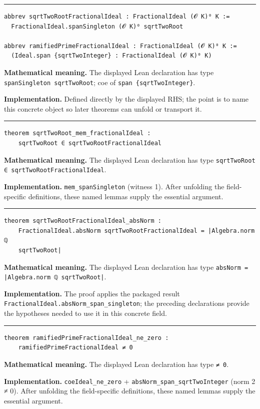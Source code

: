 \documentclass[UTF8,a4paper,11pt,fontset=fandol]{ctexart}
\theoremstyle{definition}
\newcommand{\statementsep}{\par\medskip\hrule\medskip}
\begin{document}
\statementsep
\begin{verbatim}
abbrev sqrtTwoRootFractionalIdeal : FractionalIdeal (𝓞 K)⁰ K :=
  FractionalIdeal.spanSingleton (𝓞 K)⁰ sqrtTwoRoot

abbrev ramifiedPrimeFractionalIdeal : FractionalIdeal (𝓞 K)⁰ K :=
  (Ideal.span {sqrtTwoInteger} : FractionalIdeal (𝓞 K)⁰ K)
\end{verbatim}
\noindent\textbf{Mathematical meaning.} The displayed Lean declaration has type \texttt{spanSingleton sqrtTwoRoot}; coe of \texttt{span \{sqrtTwoInteger\}}.\par
\noindent\textbf{Implementation.} Defined directly by the displayed RHS; the point is to name this concrete object so later theorems can unfold or transport it.\par
\statementsep
\begin{verbatim}
theorem sqrtTwoRoot_mem_fractionalIdeal :
    sqrtTwoRoot ∈ sqrtTwoRootFractionalIdeal
\end{verbatim}
\noindent\textbf{Mathematical meaning.} The displayed Lean declaration has type \texttt{sqrtTwoRoot ∈ sqrtTwoRootFractionalIdeal}.\par
\noindent\textbf{Implementation.} \texttt{mem\_\allowbreak{}spanSingleton} (witness 1). After unfolding the field-specific definitions, these named lemmas supply the essential argument.\par
\statementsep
\begin{verbatim}
theorem sqrtTwoRootFractionalIdeal_absNorm :
    FractionalIdeal.absNorm sqrtTwoRootFractionalIdeal = |Algebra.norm ℚ
    sqrtTwoRoot|
\end{verbatim}
\noindent\textbf{Mathematical meaning.} The displayed Lean declaration has type \texttt{absNorm = |Algebra.\allowbreak{}norm ℚ sqrtTwoRoot|}.\par
\noindent\textbf{Implementation.} The proof applies the packaged result \texttt{FractionalIdeal.\allowbreak{}absNorm\_\allowbreak{}span\_\allowbreak{}singleton}; the preceding declarations provide the hypotheses needed to use it in this concrete field.\par
\statementsep
\begin{verbatim}
theorem ramifiedPrimeFractionalIdeal_ne_zero :
    ramifiedPrimeFractionalIdeal ≠ 0
\end{verbatim}
\noindent\textbf{Mathematical meaning.} The displayed Lean declaration has type \texttt{≠ 0}.\par
\noindent\textbf{Implementation.} \texttt{coeIdeal\_\allowbreak{}ne\_\allowbreak{}zero} + \texttt{absNorm\_\allowbreak{}span\_\allowbreak{}sqrtTwoInteger} (norm 2 ≠ 0). After unfolding the field-specific definitions, these named lemmas supply the essential argument.\par
\end{document}
